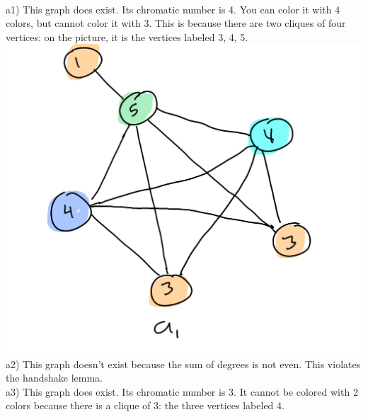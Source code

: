 \documentclass{article}
\begin{document}
\newpage
\begin{solution} \\
	a1)  This graph does exist. Its chromatic number is 4. You can color it with 4 colors, but cannot color it with 3. This is because there are two cliques of four vertices: on the picture, it is the vertices labeled 3, 4, 5.
	\\ \includegraphics[scale=0.4]{a1.png}
	\\
	a2) This graph doesn't exist because the sum of degrees is not even. This violates the handshake lemma.
	\\
	a3) This graph does exist. Its chromatic number is 3. It cannot be colored with 2 colors because there is a clique of 3: the three vertices labeled 4.

\end{solution}
\end{document}
